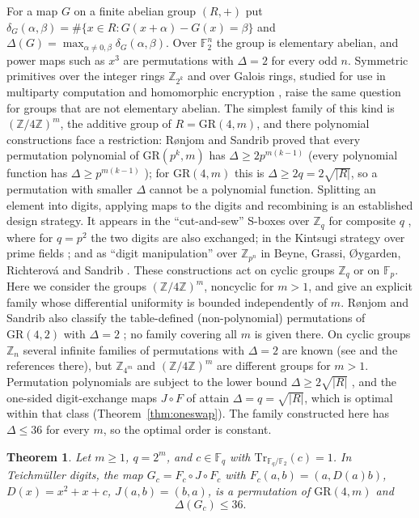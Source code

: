 \documentclass[11pt]{amsart}
\newtheorem{theorem}{Theorem}[section]
\theoremstyle{definition}
\newcommand{\F}{\mathbb{F}}
\newcommand{\Fq}{\mathbb{F}_q}
\newcommand{\GR}{\mathrm{GR}}
\newcommand{\Tr}{\mathrm{Tr}}
\newcommand{\diff}{\delta}
\newcommand{\needlines}[1]{\par\vskip 0pt plus #1\baselineskip\penalty-200\vskip 0pt plus -#1\baselineskip}
\begin{document}
For a map $G$ on a finite abelian group $(R,+)$ put
$\diff_G(\alpha,\beta)=\#\{x\in R: G(x+\alpha)-G(x)=\beta\}$ and $\Delta(G)=\max_{\alpha\ne0,\beta}\diff_G(\alpha,\beta)$.
Over $\F_2^n$ the group is elementary abelian, and power maps such as $x^3$ are permutations with $\Delta=2$ for every odd $n$.
Symmetric primitives over the integer rings $\mathbb Z_{2^k}$ and over Galois rings, studied for use in multiparty computation and
homomorphic encryption \cite{GMHORW,BGORS}, raise the same question for groups that are not elementary abelian. The simplest family
of this kind is $(\mathbb Z/4\mathbb Z)^m$, the additive group of $R=\GR(4,m)$, and there polynomial constructions face a
restriction: R{\o}njom and Sandrib proved that every permutation polynomial of
$\GR(p^k,m)$ has $\Delta\ge 2p^{m(k-1)}$ \cite[Theorem~3]{RS} (every polynomial function has $\Delta\ge p^{m(k-1)}$
\cite[Proposition~2]{RS}); for $\GR(4,m)$ this is $\Delta\ge 2q=2\sqrt{|R|}$, so a permutation with smaller $\Delta$ cannot be a
polynomial function.
Splitting an element into digits, applying maps to the digits and recombining is an established design strategy. It appears in the
``cut-and-sew'' S-boxes over $\mathbb Z_q$ for composite $q$ \cite[\S4.3]{GMHORW}, where for $q=p^2$ the two digits are also
exchanged; in the Kintsugi strategy over prime fields \cite[\S2]{Monolith}; and as ``digit manipulation'' over $\mathbb Z_{p^n}$
in Beyne, Grassi, {\O}ygarden, Richterov\'a and Sandrib \cite[\S9]{BGORS}. These constructions act on cyclic groups $\mathbb Z_q$
or on $\F_p$. Here we consider the groups $(\mathbb Z/4\mathbb Z)^m$, noncyclic for $m>1$, and give an explicit family whose differential
uniformity is bounded independently of $m$.
R{\o}njom and Sandrib also classify the table-defined (non-polynomial) permutations of $\GR(4,2)$ with $\Delta=2$ \cite[\S5]{RS};
no family covering all $m$ is given there. On cyclic groups $\mathbb Z_n$ several infinite families of permutations with $\Delta=2$
are known (see \cite{Tang} and the references there), but $\mathbb Z_{4^m}$ and $(\mathbb Z/4\mathbb Z)^m$ are different groups for
$m>1$.
Permutation polynomials are subject to the lower bound $\Delta\ge2\sqrt{|R|}$ \cite{RS}, and the one-sided digit-exchange maps
$J\circ F$ of \cite{FukuiDE} attain $\Delta=q=\sqrt{|R|}$, which is optimal within that class (Theorem~\ref{thm:oneswap}).
The family constructed here has $\Delta\le36$ for every $m$, so the optimal order is constant.

\needlines{8}
\begin{theorem}\label{thm:main}
Let $m\ge1$, $q=2^m$, and $c\in\Fq$ with $\Tr_{\Fq/\F_2}(c)=1$. In Teichm\"uller digits, the map
$G_c=F_c\circ J\circ F_c$ with $F_c(a,b)=(a,D(a)b)$, $D(x)=x^2+x+c$, $J(a,b)=(b,a)$, is a permutation of $\GR(4,m)$ and
\[
\Delta(G_c)\le 36 .
\]
\end{theorem}
\end{document}
